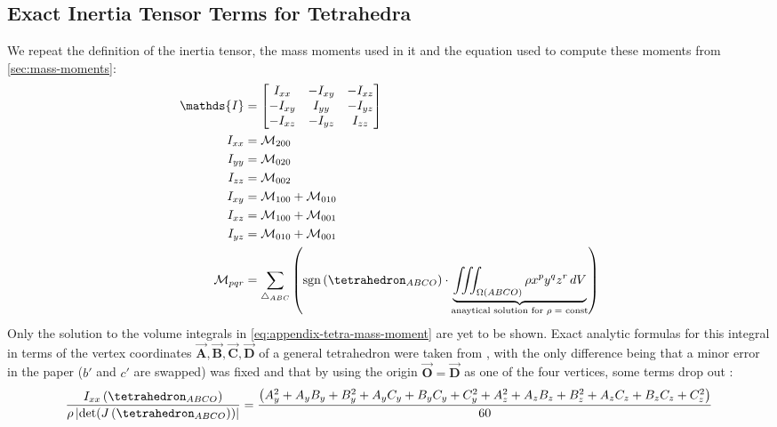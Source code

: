 \documentclass[oneside, a4paper]{book}
\newcommand\abs[1]{\left|#1\right|}
\newcommand\vek[1]{\vec{\bm{#1}}}
\newcommand\br[1]{\left(#1\right)}
\DeclareMathOperator{\sgn}{sgn}
\begin{document}
\begin{appendices}
  \chapter{Exact Inertia Tensor Terms for Tetrahedra}\label{chp:analytic-tetrahedron-inertia}
  We repeat the definition of the inertia tensor, the mass moments used in it and the equation used to compute these moments from \autoref{sec:mass-moments}:
  \begin{align}
    \mathds{I} &= \begin{bmatrix}
      I_{xx}&-I_{xy}&-I_{xz}\\
      -I_{xy}&I_{yy}&-I_{yz}\\
      -I_{xz}&-I_{yz}&I_{zz}
    \end{bmatrix}\\
    I_{xx} &= \mathcal{M}_{200}\\
    I_{yy} &= \mathcal{M}_{020}\\
    I_{zz} &= \mathcal{M}_{002}\\
    I_{xy} &= \mathcal{M}_{100} + \mathcal{M}_{010}\\
    I_{xz} &= \mathcal{M}_{100} + \mathcal{M}_{001}\\
    I_{yz} &= \mathcal{M}_{010} + \mathcal{M}_{001}\\
    \mathcal{M}_{pqr} &= \sum_{\triangle_{ABC}} \br{\sgn\br{\tetrahedron_{ABCO}} \cdot \underbrace{\iiint_{\Omega\br{ABCO}} \rho x^p y^q z^r  \,dV}_{\text{anaytical solution for $\rho=$ const}}}\label{eq:appendix-tetra-mass-moment}
  \end{align}
  Only the solution to the volume integrals in \autoref{eq:appendix-tetra-mass-moment} are yet to be shown. Exact analytic formulas for this integral in terms of the vertex coordinates $\vek{A},\vek{B},\vek{C},\vek{D}$ of a general tetrahedron were taken from \autocite[Tonon]{explicit-exact-tetrahedron-formulas}, with the only difference being that a minor error in the paper ($b'$ and $c'$ are swapped) was fixed and that by using the origin $\vek{O} = \vek{D}$ as one of the four vertices, some terms drop out \autocite{explicit-exact-tetrahedron-formulas}:
  \begin{align}
    \frac{I_{xx}\br{\tetrahedron_{ABCO}}}{\rho \abs{\det(J\br{\tetrahedron_{ABCO}})} } &= \frac{\br{
      A_y^2 + A_yB_y+B_y^2 + A_yC_y + B_yC_y + C_y^2 + 
      A_z^2 + A_zB_z+B_z^2 + A_zC_z + B_zC_z + C_z^2
    }}{60}\\

\end{align}
\end{appendices}
\end{document}
